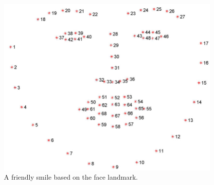 \begin{figure}[ht]
  \centering
   \includegraphics[width=\linewidth]{visual.png}
   \caption{A friendly smile based on the face landmark.} 
   \label{fig:visual}
\end{figure}

\newpage

